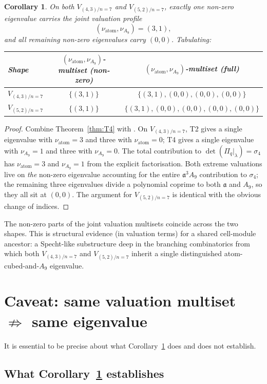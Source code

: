 \documentclass[11pt]{article}
\theoremstyle{plain}
\newtheorem{corollary}[theorem]{Corollary}
\theoremstyle{definition}
\theoremstyle{remark}
\newcommand{\Pibs}{\Pi_q}
\newcommand{\val}{\nu_{\mathrm{atom}}}
\newcommand{\valA}{\nu_{A_9}}
\newcommand{\atom}{\mathfrak{a}}
\begin{document}
\begin{corollary}
\label{cor:combined}
On both $V_{(4,3)/n=7}$ and $V_{(5,2)/n=7}$, exactly one non-zero eigenvalue
carries the joint valuation profile
\[ (\val, \valA) = (3, 1), \]
and all remaining non-zero eigenvalues carry $(0, 0)$.  Tabulating:
\begin{center}
\begin{tabular}{l|c|c}
Shape & $(\val, \valA)$-multiset (non-zero) & $(\val, \valA)$-multiset (full) \\ \hline
$V_{(4,3)/n=7}$ & $\{(3, 1)\}$ & $\{(3,1), (0,0), (0,0), (0,0)\}$ \\
$V_{(5,2)/n=7}$ & $\{(3, 1)\}$ & $\{(3,1), (0,0), (0,0), (0,0), (0,0)\}$
\end{tabular}
\end{center}
\end{corollary}

\begin{proof}
Combine Theorem~\ref{thm:T4} with \cite[Theorems T2, T3]{Newton28}.  On
$V_{(4,3)/n=7}$, T2 gives a single eigenvalue with $\val = 3$ and three with
$\val = 0$; T4 gives a single eigenvalue with $\valA = 1$ and three with $\valA = 0$.
The total contribution to $\det(\Pibs|_\lambda) = \sigma_4$ has $\val = 3$ and
$\valA = 1$ from the explicit factorisation.  Both extreme valuations live on
\emph{the} non-zero eigenvalue accounting for the entire $\atom^3 A_9$
contribution to $\sigma_4$; the remaining three eigenvalues divide a polynomial
coprime to both $\atom$ and $A_9$, so they all sit at $(0, 0)$.  The argument for
$V_{(5,2)/n=7}$ is identical with the obvious change of indices.
\end{proof}

The non-zero parts of the joint valuation multisets coincide across the two
shapes.  This is structural evidence (in valuation terms) for a shared
cell-module ancestor: a Specht-like substructure deep in the branching
combinatorics from which both $V_{(4,3)/n=7}$ and $V_{(5,2)/n=7}$ inherit a
single distinguished atom-cubed-and-$A_9$ eigenvalue.

\section{Caveat: same valuation multiset $\not\Rightarrow$ same eigenvalue}
\label{sec:caveat}

It is essential to be precise about what Corollary~\ref{cor:combined} does and
does not establish.

\subsection{What Corollary~\ref{cor:combined} establishes}
\end{document}
